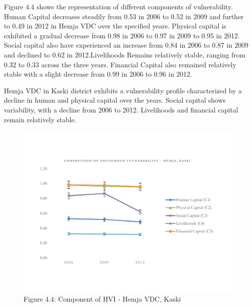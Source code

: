 Figure 4.4 shows the representation of different components of vulnerability. Human Capital decreases steadily from 0.53 in 2006 to 0.52 in 2009 and further to 0.49 in 2012 in Hemja VDC over the specified years. Physical capital is exhibited a gradual decrease from 0.98 in 2006 to 0.97 in 2009 to 0.95 in 2012. Social capital also have experienced an increase from 0.84 in 2006 to 0.87 in 2009 and declined to 0.62 in 2012.Livelihoods Remains relatively stable, ranging from 0.32 to 0.33 across the three years. Financial Capital also remained relatively stable with a slight decrease from 0.99 in 2006 to 0.96 in 2012. 

Hemja VDC in Kaski district exhibits a vulnerability profile characterized by a decline in human and physical capital over the years. Social capital shows variability, with a decline from 2006 to 2012. Livelihoods and financial capital remain relatively stable. 
\begin{figure}[ht]
	\vspace{-50pt}
	\includegraphics[scale=0.6]{Graphs and figures/HVI_Component_Hemja_line.pdf}
	\captionsetup{labelformat=empty}
	\vspace{-50pt} %
	\caption{Figure 4.4: Component of HVI - Hemja VDC, Kaski}
	\setlength{\abovecaptionskip}{4pt}
	\label{fig:hvihemjacomponent}
\end{figure}

